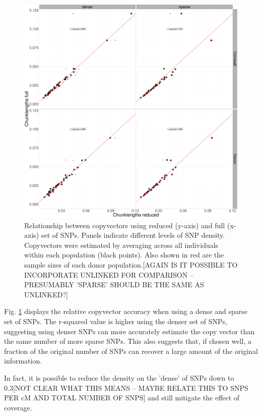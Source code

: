 \begin{figure}[htp]
    \centering
    \includegraphics[width=1.0\textwidth]{../images/chapter1/dense_sparse_devon_cornwall_collapsed.pdf}
    \caption{Relationship between copyvectors using reduced (y-axis) and full (x-axis) set of SNPs. Panels indicate different levels of SNP density. Copyvectors were estimated by averaging across all individuals within each population (black points). Also shown in red are the sample sizes of each donor population.{\color{red}[AGAIN IS IT POSSIBLE TO INCORPORATE UNLINKED FOR COMPARISON -- PRESUMABLY 'SPARSE' SHOULD BE THE SAME AS UNLINKED?]}}
    \label{fig:dense_sparse_devon_cornwall_collapsed}
\end{figure}

Fig. \ref{fig:dense_sparse_devon_cornwall_collapsed} displays the relative copyvector accuracy when using a dense and sparse set of SNPs. The r-squared value is higher using the denser set of SNPs, suggesting using denser SNPs can more accurately estimate the copy vector than the same number of more sparse SNPs. This also suggests that, if chosen well, a fraction of the original number of SNPs can recover a large amount of the original information. 

In fact, it is possible to reduce the density on the 'dense' of SNPs down to {\color{red}0.3[NOT CLEAR WHAT THIS MEANS -- MAYBE RELATE THIS TO SNPS PER cM AND TOTAL NUMBER OF SNPS]} and still mitigate the effect of coverage.

